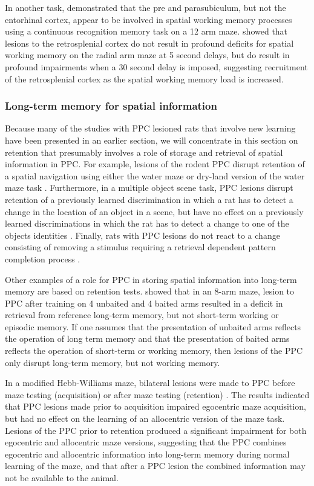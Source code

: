 \documentclass[doc, longtable]{apa6}
\begin{document}
In another task, \textcite{Kesner1998b} demonstrated that the pre and parasubiculum, but not the entorhinal cortex, appear to be involved in spatial working memory processes using a continuous recognition memory task on a 12 arm maze. \textcite{Keene2009a} showed that lesions to the retrosplenial cortex do not result in profound deficits for spatial working memory on the radial arm maze at 5 second delays, but do result in profound impairments when a 30 second delay is imposed, suggesting recruitment of the retrosplenial cortex as the spatial working memory load is increased.

\subsubsection{Long-term memory for spatial information}
Because many of the studies with PPC lesioned rats that involve new learning have been presented in an earlier section, we will concentrate in this section on retention that presumably involves a role of storage and retrieval of spatial information in PPC. For example, lesions of the rodent PPC disrupt retention of a spatial navigation using either the water maze or dry-land version of the water maze task \parencite{DiMattia1988a, Save1996a, Kesner1991a}. Furthermore, in a multiple object scene task, PPC lesions disrupt retention of a previously learned discrimination in which a rat has to detect a change in the location of an object in a scene, but have no effect on a previously learned discriminations in which the rat has to detect a change to one of the objects identities \parencite{DeCoteau1998}. Finally, rats with PPC lesions do not react to a change consisting of removing a stimulus requiring a retrieval dependent pattern completion process \parencite{Save1992a}. 
	
Other examples of a role for PPC in storing spatial information into long-term memory are based on retention tests. \textcite{Kesner1987a} showed that in an 8-arm maze, lesion to PPC after training on 4 unbaited and 4 baited arms resulted in a deficit in retrieval from reference long-term memory, but not short-term working or episodic memory. If one assumes that the presentation of unbaited arms reflects the operation of long term memory and that the presentation of baited arms reflects the operation of short-term or working memory, then lesions of the PPC only disrupt long-term memory, but not working memory. 
	
In a modified Hebb-Williams maze, bilateral lesions were made to PPC before maze testing (acquisition) or after maze testing (retention) \parencite{Rogers2007a}. The results indicated that PPC lesions made prior to acquisition impaired egocentric maze acquisition, but had no effect on the learning of an allocentric version of the maze task. Lesions of the PPC prior to retention produced a significant impairment for both egocentric and allocentric maze versions, suggesting that the PPC combines egocentric and allocentric information into long-term memory during normal learning of the maze, and that after a PPC lesion the combined information may not be available to the animal. 
	
\end{document}
